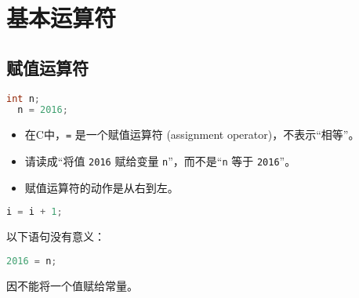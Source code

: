 \section{基本运算符}

\subsection{赋值运算符}
\begin{frame}[fragile]\ft{\subsecname}
\begin{lstlisting}[language=c,backgroundcolor=\color{red!10}]
  int n; 
  n = 2016;
\end{lstlisting} \pause 

\begin{itemize}
\item  在C中，\lstinline|=| 是一个赋值运算符 (assignment operator)，不表示“相等”。\\[0.15in]
\item 请读成“将值 \lstinline|2016| 赋给变量 \lstinline|n|”，而不是“\lstinline|n| 等于 \lstinline|2016|”。\\[0.15in]
\item 赋值运算符的动作是从右到左。
\end{itemize}

\end{frame}

\begin{frame}[fragile]\ft{\subsecname}
\begin{lstlisting}[language=c,backgroundcolor=\color{red!10}]
  i = i + 1;
\end{lstlisting} \pause 
\begin{figure}
\centering
{}
\end{figure}
\end{frame}

\begin{frame}[fragile]\ft{\subsecname}
以下语句没有意义：
\begin{lstlisting}[language=c,backgroundcolor=\color{red!10}]
  2016 = n;
\end{lstlisting}        
因不能将一个值赋给常量。
\end{frame}

